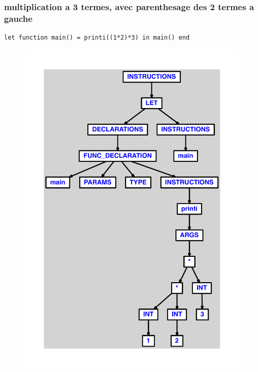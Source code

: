 \documentclass{article}
\begin{document}
\subsubsection{multiplication a 3 termes, avec parenthesage des 2 termes a gauche}
\begin{lstlisting}
let function main() = printi((1*2)*3) in main() end
\end{lstlisting}
\newpage
\begin{figure}[H]
\centering
\includegraphics[max width=\textwidth]{ast/ast_101.pdf}
\end{figure}
\newpage
\end{document}
